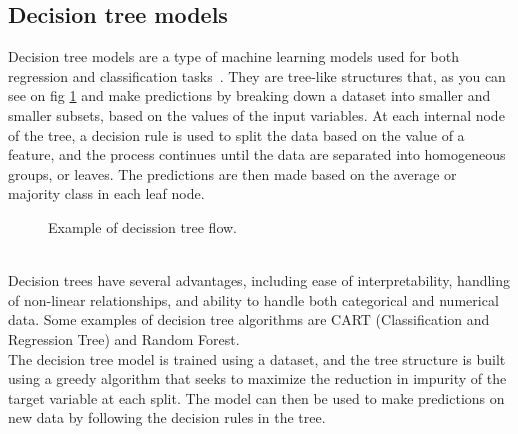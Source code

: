     \subsection{Decision tree models} \label{sec:trees}
    Decision tree models are a type of machine learning models used for both regression and classification tasks~\cite{Kotsiantis}.
    They are tree-like structures that, as you can see on fig \ref{fig:example_tree} and
    make predictions by breaking down a dataset into smaller and smaller subsets, based on the values of the input variables. At each internal
    node of the tree, a decision rule is used to split the data based on the value of a feature, and the process continues until the data are separated
    into homogeneous groups, or leaves. The predictions are then made based on the average or majority class in each leaf node.
    \begin{figure}
        \centering
        \caption{Example of decission tree flow.}
        \label{fig:example_tree}
    \end{figure}
    \\
    Decision trees have several advantages, including ease of interpretability, handling of non-linear relationships, and ability to handle both
    categorical and numerical data. Some examples of decision tree algorithms are CART (Classification and Regression Tree) and Random Forest.
    \\
    The decision tree model is trained using a dataset, and the tree structure is built using a greedy algorithm that seeks to maximize
    the reduction in impurity of the target variable at each split. The model can then be used to make predictions on new data by following
    the decision rules in the tree.
